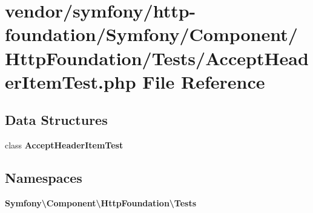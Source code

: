 \section{vendor/symfony/http-\/foundation/\+Symfony/\+Component/\+Http\+Foundation/\+Tests/\+Accept\+Header\+Item\+Test.php File Reference}
\label{_accept_header_item_test_8php}
\subsection*{Data Structures}
\begin{DoxyCompactItemize}
\item 
class {\bf Accept\+Header\+Item\+Test}
\end{DoxyCompactItemize}
\subsection*{Namespaces}
\begin{DoxyCompactItemize}
\item 
 {\bf Symfony\textbackslash{}\+Component\textbackslash{}\+Http\+Foundation\textbackslash{}\+Tests}
\end{DoxyCompactItemize}
